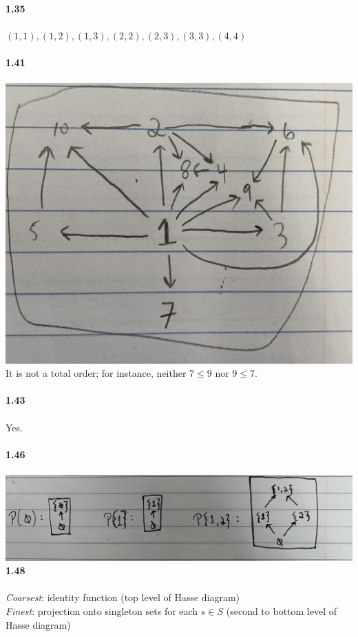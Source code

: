 \documentclass{article}
\begin{document}
 \\
\textbf{1.35}\\
 \\
$(1,1),(1,2),(1,3),(2,2),(2,3),(3,3),(4,4)$\\
 \\
\textbf{1.41}\\
 \\
\includegraphics[scale=0.1]{7sketches-1-41.jpg}\\
It is not a total order; for instance, neither $7\leq 9$ nor $9\leq 7$.\\
 \\
\textbf{1.43}\\
 \\
Yes.\\
 \\
\textbf{1.46}\\
 \\
\includegraphics[scale=0.1]{7sketches-1-46.jpg}
\newpage
\textbf{1.48}\\
 \\
\textit{Coarsest}: identity function (top level of Hasse diagram) \\
\textit{Finest}: projection onto singleton sets for each $s\in S$ (second to bottom level of Hasse diagram)\\
\end{document}
